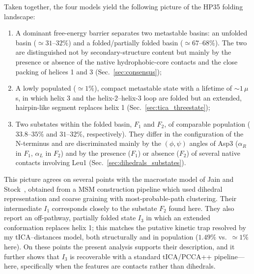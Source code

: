 \documentclass[prl,twocolumn]{revtex4-1}
\begin{document}
Taken together, the four models yield the following picture of the HP35 folding landscape:
\begin{enumerate}
    \item A dominant free-energy barrier separates two metastable basins: an unfolded basin ($\simeq 31$--$32\%$) and a folded/partially folded basin ($\simeq 67$--$68\%$). The two are distinguished not by secondary-structure content but mainly by the presence or absence of the native hydrophobic-core contacts and the close packing of helices 1 and 3 (Sec.~\ref{sec:consensus});
    \item A lowly populated ($\simeq 1\%$), compact metastable state with a lifetime of $\sim 1\,\mu$s, in which helix 3 and the helix-2--helix-3 loop are folded but an extended, hairpin-like segment replaces helix 1 (Sec.~\ref{sec:tica_threestate});
    \item Two substates within the folded basin, $F_1$ and $F_2$, of comparable population ($33.8$--$35\%$ and $31$--$32\%$, respectively). They differ in the configuration of the N-terminus and are discriminated mainly by the $(\phi,\psi)$ angles of Asp3 ($\alpha_R$ in $F_1$, $\alpha_L$ in $F_2$) and by the presence ($F_1$) or absence ($F_2$) of several native contacts involving Leu1 (Sec.~\ref{sec:dihedrals_substates}).
\end{enumerate}

This picture agrees on several points with the macrostate model of Jain and Stock~\cite{hierarchical_hp35}, obtained from a MSM construction pipeline which used dihedral representation and coarse graining with most-probable-path clustering. Their intermediate $I_1$ corresponds closely to the substate $F_2$ found here. They also report an off-pathway, partially folded state $I_3$ in which an extended conformation replaces helix 1; this matches the putative kinetic trap resolved by my tICA--distances model, both structurally and in population ($1.49\%$ vs.\ $\simeq 1\%$ here). On these points the present analysis supports their description, and it further shows that $I_3$ is recoverable with a standard tICA/PCCA++ pipeline---here, specifically when the features are contacts rather than dihedrals.
\end{document}
